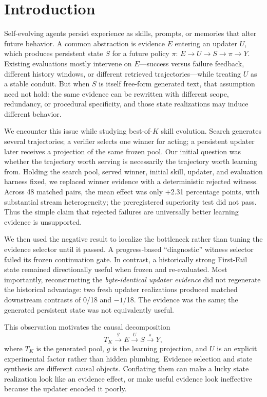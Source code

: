\section{Introduction}

Self-evolving agents persist experience as skills, prompts, or memories that alter future behavior. A common abstraction is evidence $E$ entering an updater $U$, which produces persistent state $S$ for a future policy $\pi$: $E\!\rightarrow\!U\!\rightarrow\!S\!\rightarrow\!\pi\!\rightarrow\!Y$. Existing evaluations mostly intervene on $E$---success versus failure feedback, different history windows, or different retrieved trajectories---while treating $U$ as a stable conduit. But when $S$ is itself free-form generated text, that assumption need not hold: the same evidence can be rewritten with different scope, redundancy, or procedural specificity, and those state realizations may induce different behavior.

We encounter this issue while studying best-of-$K$ skill evolution. Search generates several trajectories; a verifier selects one winner for acting; a persistent updater later receives a projection of the same frozen pool. Our initial question was whether the trajectory worth serving is necessarily the trajectory worth learning from. Holding the search pool, served winner, initial skill, updater, and evaluation harness fixed, we replaced winner evidence with a deterministic rejected witness. Across 48 matched pairs, the mean effect was only +2.31 percentage points, with substantial stream heterogeneity; the preregistered superiority test did not pass. Thus the simple claim that rejected failures are universally better learning evidence is unsupported.

We then used the negative result to localize the bottleneck rather than tuning the evidence selector until it passed. A progress-based ``diagnostic'' witness selector failed its frozen continuation gate. In contrast, a historically strong First-Fail state remained directionally useful when frozen and re-evaluated. Most importantly, reconstructing the \emph{byte-identical updater evidence} did not regenerate the historical advantage: two fresh updater realizations produced matched downstream contrasts of 0/18 and $-1$/18. The evidence was the same; the generated persistent state was not equivalently useful.

This observation motivates the causal decomposition
\begin{equation}
T_K \xrightarrow{g} E \xrightarrow{U} S \xrightarrow{\pi} Y,
\end{equation}
where $T_K$ is the generated pool, $g$ is the learning projection, and $U$ is an explicit experimental factor rather than hidden plumbing. Evidence selection and state synthesis are different causal objects. Conflating them can make a lucky state realization look like an evidence effect, or make useful evidence look ineffective because the updater encoded it poorly.

